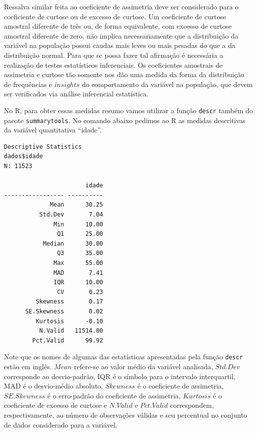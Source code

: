\documentclass[
  letterpaper,
  DIV=11,
  numbers=noendperiod]{scrreprt}
\newenvironment{Shaded}{\begin{snugshade}}{\end{snugshade}}
\newcommand{\FunctionTok}[1]{\textcolor[rgb]{0.28,0.35,0.67}{#1}}
\newcommand{\NormalTok}[1]{\textcolor[rgb]{0.00,0.23,0.31}{#1}}
\newcommand{\SpecialCharTok}[1]{\textcolor[rgb]{0.37,0.37,0.37}{#1}}
\begin{document}
Ressalva similar feita ao coeficiente de assimetria deve ser considerado
para o coeficiente de curtose ou de excesso de curtose. Um coeficiente
de curtose amostral diferente de três ou, de forma equivalente, com
excesso de curtose amostral diferente de zero, não implica
necessariamente que a distribuição da variável na população possui
caudas mais leves ou mais pesadas do que a da distribuição normal. Para
que se possa fazer tal afirmação é necessária a realização de testes
estatísticos inferenciais. Os coeficientes amostrais de assimetria e
curtose tão somente nos dão uma medida da forma da distribuição de
frequências e \(insights\) do comportamento da variável na população,
que devem ser verificados via análise inferencial estatística.

No R, para obter essas medidas resumo vamos utilizar a função
\texttt{descr} também do pacote \texttt{summarytools}. No comando abaixo
pedimos ao R as medidas descritivas da variável quantitativa ``idade''.

\begin{Shaded}
\end{Shaded}

\begin{verbatim}
Descriptive Statistics  
dados$idade  
N: 11523  

                       idade
----------------- ----------
             Mean      30.25
          Std.Dev       7.04
              Min      10.00
               Q1      25.00
           Median      30.00
               Q3      35.00
              Max      55.00
              MAD       7.41
              IQR      10.00
               CV       0.23
         Skewness       0.17
      SE.Skewness       0.02
         Kurtosis      -0.10
          N.Valid   11514.00
        Pct.Valid      99.92
\end{verbatim}

Note que os nomes de algumas das estatísticas apresentadas pela função
\texttt{descr} estão em inglês. \(Mean\) refere-se ao valor médio da
variável analisada, \(Std.Dev\) corresponde ao desvio-padrão, IQR é o
símbolo para o intervalo interquartil, MAD é o desvio-médio absoluto,
\(Skewness\) é o coeficiente de assimetria, \(SE.Skewness\) é o
erro-padrão do coeficiente de assimetria, \(Kurtosis\) é o coeficiente
de excesso de curtose e \(N.Valid\) e \(Pct.Valid\) correspondem,
respectivamente, ao número de observações válidas e seu percentual no
conjunto de dados considerado para a variável.
\end{document}
